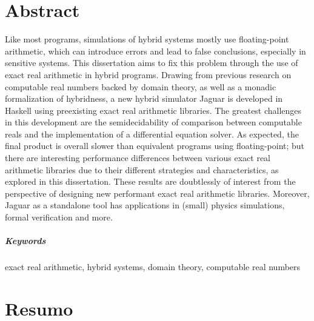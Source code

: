 \chapter*{Abstract}


Like most programs, simulations of hybrid systems mostly use floating-point arithmetic, which can introduce errors and lead to false conclusions, especially in sensitive systems. This dissertation aims to fix this problem through the use of exact real arithmetic in hybrid programs. Drawing from previous research on computable real numbers backed by domain theory, as well as a monadic formalization of hybridness, a new hybrid simulator Jaguar is developed in Haskell using preexisting exact real arithmetic libraries. The greatest challenges in this development are the semidecidability of comparison between computable reals and the implementation of a differential equation solver. As expected, the final product is overall slower than equivalent programs using floating-point; but there are interesting performance differences between various exact real arithmetic libraries due to their different strategies and characteristics, as explored in this dissertation. These results are doubtlessly of interest from the perspective of designing new performant exact real arithmetic libraries. Moreover, Jaguar as a standalone tool has applications in (small) physics simulations, formal verification and more.

\paragraph{Keywords} exact real arithmetic, hybrid systems, domain theory, computable real numbers

\cleardoublepage

\chapter*{Resumo}

